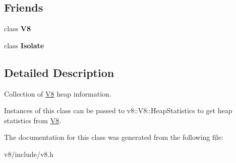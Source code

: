\subsection*{Friends}
\begin{DoxyCompactItemize}
\item 
class {\bfseries V8}\hypertarget{classv8_1_1HeapStatistics_a51a1fbf409294cf02a99a020ac94a763}{}\label{classv8_1_1HeapStatistics_a51a1fbf409294cf02a99a020ac94a763}

\item 
class {\bfseries Isolate}\hypertarget{classv8_1_1HeapStatistics_aba4f0964bdacf2bbf62cf876e5d28d0a}{}\label{classv8_1_1HeapStatistics_aba4f0964bdacf2bbf62cf876e5d28d0a}

\end{DoxyCompactItemize}


\subsection{Detailed Description}
Collection of \hyperlink{classv8_1_1V8}{V8} heap information.

Instances of this class can be passed to v8\+::\+V8\+::\+Heap\+Statistics to get heap statistics from \hyperlink{classv8_1_1V8}{V8}. 

The documentation for this class was generated from the following file\+:\begin{DoxyCompactItemize}
\item 
v8/include/v8.\+h\end{DoxyCompactItemize}
